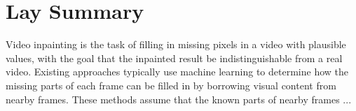 

\chapter{Lay Summary}

Video inpainting is the task of filling in missing pixels in a video with plausible values, with the goal that the inpainted result be indistinguishable from a real video. Existing approaches typically use machine learning to determine how the missing parts of each frame can be filled in by borrowing visual content from nearby frames. These methods assume that the known parts of nearby frames ... 